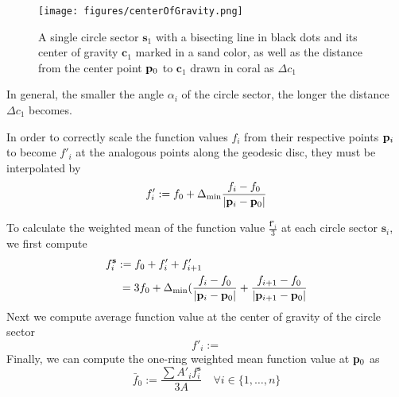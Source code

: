 \begin{figure}[ht]
\ffigbox
	{\texttt{[image: figures/centerOfGravity.png]}}
	{\caption[Distance to and Center of Gravity]{A single circle sector $\mathbf{s}_1$ with a bisecting line in black dots and its center of gravity $\mathbf{c}_1$ marked in a sand color, as well as the distance from the center point $\mathbf{p}_0$ to $\mathbf{c}_1$ drawn in coral as $\Delta c_1$}\label{fig:centerOfGravity}}
\end{figure}%
%
In general, the smaller the angle $\alpha_i$ of the circle sector, the longer the distance $\Delta c_1$ becomes.

In order to correctly scale the function values $f_i$ from their respective points $\mathbf{p}_i$ to become $f'_i$ at the analogous points along the geodesic disc, they must be interpolated by 
\begin{equation}
	f'_i := f_0 + \Delta_\text{min}\frac{f_i-f_0}{|\mathbf{p}_i-\mathbf{p}_0|}
	\label{eq:avFuncValAtCoG}
\end{equation}

To calculate the weighted mean of the function value $\frac{\mathbf{f}'_i}{3}$ at each circle sector $\mathbf{s}_i$, we first compute
\begin{align}
	f^{\mathbf{s}}_i &:= f_0 + f'_i + f'_{i+1} \\
		& \: = 3f_0 + \Delta_\text{min}(\frac{f_i-f_0}{|\mathbf{p}_i-\mathbf{p}_0|} + \frac{f_{i+1}-f_0}{|\mathbf{p}_{i+1}-\mathbf{p}_0|}
	\label{eq:avFuncValAtCoG}
\end{align}
%
Next we compute average function value at the center of gravity of the circle sector
\begin{equation}
	f'_i := 
	\label{eq:avFuncValAtCoG}
\end{equation}
%
Finally, we can compute the one-ring weighted mean function value at $\mathbf{p}_0$ as
\begin{equation}
	\bar{f}_0 := \frac{\sum A'_if^{\mathbf{s}}_i}{3A} \quad \forall i \in \{1,\ldots,n\}
	\label{eq:meanFuncValAtP0}
\end{equation}%
%

\bigskip
\bigskip
\bigskip
\bigskip
\bigskip
\bigskip
\bigskip
\bigskip

